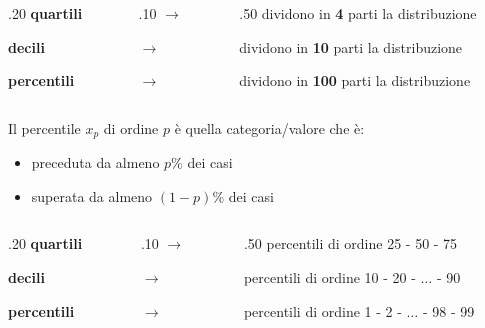 \documentclass[compress]{beamer}
\begin{document}
\begin{frame}
	\begin{columns}
		\begin{column}{.20\linewidth}
		\textbf{quartili}
	
		
		\textbf{decili}
		
		\textbf{percentili}
		\end{column}
	
	\begin{column}{.10\linewidth}
		$\rightarrow$
	
		$\rightarrow$
	
		$\rightarrow$
		
	\end{column}

\begin{column}{.50\linewidth}
	dividono in \textbf{4} parti la distribuzione
	
	
	dividono in \textbf{10} parti la distribuzione
	
	dividono in \textbf{100} parti la distribuzione 
\end{column}
	\end{columns}
\end{frame}

\begin{frame}
	Il percentile $x_p$ di ordine $p$ è
	quella categoria/valore che è:
	
	\begin{itemize}
	\item preceduta da almeno $p$\% dei casi
	\item superata da almeno $(1-p)$\% dei casi
	\end{itemize}

	\begin{columns}
	\begin{column}{.20\linewidth}
		\textbf{quartili}

		
		\textbf{decili}
		
		\textbf{percentili}
	\end{column}
	
	\begin{column}{.10\linewidth}
		$\rightarrow$
		
		$\rightarrow$
		
		$\rightarrow$
		
	\end{column}
	
	\begin{column}{.50\linewidth}
		percentili di ordine 25 - 50 - 75
		
		
	percentili di ordine 10 - 20 - $\ldots$ - 90
		
			percentili di ordine 1 - 2 - $\ldots$ - 98 - 99
	\end{column}
\end{columns}
\end{frame}
\end{document}

